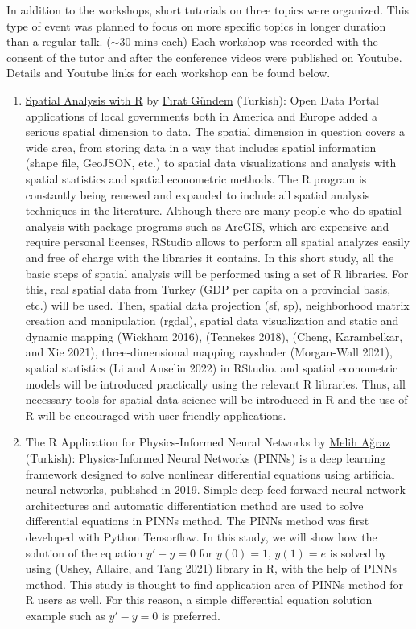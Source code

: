 In addition to the workshops, short tutorials on three topics were organized. This type of event was planned to focus on more specific topics in longer duration than a regular talk. (\(\sim 30\) mins each) Each workshop was recorded with the consent of the tutor and after the conference videos were published on Youtube. Details and Youtube links for each workshop can be found below.

\begin{enumerate}
\def\labelenumi{\arabic{enumi}.}
\item
  \href{https://www.youtube.com/watch?v=4LRYv36Ik2k}{Spatial Analysis with R} by \href{https://www.linkedin.com/in/f\%C4\%B1rat-g\%C3\%BCndem-380496108/}{Fırat Gündem} (Turkish):
  Open Data Portal applications of local governments both in America and Europe added a serious spatial dimension to data. The spatial dimension in question covers a wide area, from storing data in a way that includes spatial information (shape file, GeoJSON, etc.) to spatial data visualizations and analysis with spatial statistics and spatial econometric methods. The R program is constantly being renewed and expanded to include all spatial analysis techniques in the literature. Although there are many people who do spatial analysis with package programs such as ArcGIS, which are expensive and require personal licenses, RStudio allows to perform all spatial analyzes easily and free of charge with the libraries it contains. In this short study, all the basic steps of spatial analysis will be performed using a set of R libraries. For this, real spatial data from Turkey (GDP per capita on a provincial basis, etc.) will be used. Then, spatial data projection (sf, sp), neighborhood matrix creation and manipulation (rgdal), spatial data visualization and static and dynamic mapping  (Wickham 2016),  (Tennekes 2018),  (Cheng, Karambelkar, and Xie 2021), three-dimensional mapping rayshader (Morgan-Wall 2021), spatial statistics  (Li and Anselin 2022) in RStudio. and spatial econometric models will be introduced practically using the relevant R libraries. Thus, all necessary tools for spatial data science will be introduced in R and the use of R will be encouraged with user-friendly applications.
\item
  The R Application for Physics-Informed Neural Networks by \href{https://www.linkedin.com/in/melih-agraz-5a45b737/}{Melih Ağraz} (Turkish):
  Physics-Informed Neural Networks (PINNs) is a deep learning framework designed to solve nonlinear differential equations using artificial neural networks, published in 2019. Simple deep feed-forward neural network architectures and automatic differentiation method are used to solve differential equations in PINNs method. The PINNs method was first developed with Python Tensorflow. In this study, we will show how the solution of the equation \(y'-y=0\) for \(y(0)=1\), \(y(1)=e\) is solved by using  (Ushey, Allaire, and Tang 2021) library in R, with the help of PINNs method. This study is thought to find application area of PINNs method for R users as well. For this reason, a simple differential equation solution example such as \(y' - y = 0\) is preferred.

\end{enumerate}
